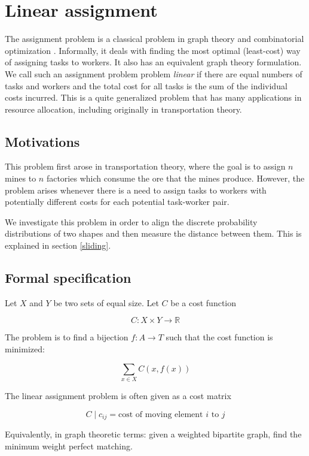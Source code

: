 \documentclass[../tech_report_1.tex]{subfiles}
\begin{document}
\section{Linear assignment}

The assignment problem is a classical problem in graph theory and combinatorial optimization \cite{burkard1999linear}. Informally, it deals with finding the most optimal (least-cost) way of assigning tasks to workers. It also has an equivalent graph theory formulation. We call such an assignment problem problem \textit{linear} if there are equal numbers of tasks and workers and the total cost for all tasks is the sum of the individual costs incurred. This is a quite generalized problem that has many applications in resource allocation, including originally in transportation theory.


\subsection{Motivations}

This problem first arose in transportation theory, where the goal is to assign $n$ mines to $n$ factories which consume the ore that the mines produce. However, the problem arises whenever there is a need to assign tasks to workers with potentially different costs for each potential task-worker pair.

We investigate this problem in order to align the discrete probability distributions of two shapes and then measure the distance between them. This is explained in section \ref{sliding}.


\subsection{Formal specification}

Let $X$ and $Y$ be two sets of equal size. Let $C$ be a cost function

$$C: X \times Y \rightarrow \mathbb{R}$$

The problem is to find a bijection $f: A \rightarrow T$ such that the cost function is minimized:

$$ \sum_{x \in X} C(x,f(x))$$

The linear assignment problem is often given as a cost matrix

$$ C \mid c_{ij} = \text{cost of moving element } i \text{ to } j$$

Equivalently, in graph theoretic terms: given a weighted bipartite graph, find the minimum weight perfect matching.
\end{document}
